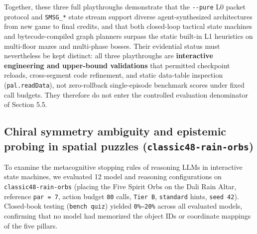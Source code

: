 \documentclass[11pt,a4paper]{article}
\begin{document}
Together, these three full playthroughs demonstrate that the \texttt{-\allowbreak{}-\allowbreak{}pure} L0 packet protocol and \texttt{SMSG\allowbreak{}\_\allowbreak{}*} state stream support diverse agent-synthesized architectures from new game to final credits, and that both closed-loop tactical state machines and bytecode-compiled graph planners surpass the static built-in L1 heuristics on multi-floor mazes and multi-phase bosses. Their evidential status must nevertheless be kept distinct: all three playthroughs are \textbf{interactive engineering and upper-bound validations} that permitted checkpoint reloads, cross-segment code refinement, and static data-table inspection (\texttt{pal\allowbreak{}.\allowbreak{}readData}), not zero-rollback single-episode benchmark scores under fixed call budgets. They therefore do not enter the controlled evaluation denominator of Section 5.5.

\subsection{\texorpdfstring{Chiral symmetry ambiguity and epistemic probing in spatial puzzles (\texttt{classic48\allowbreak{}-\allowbreak{}rain\allowbreak{}-\allowbreak{}orbs})}{Chiral symmetry ambiguity and epistemic probing in spatial puzzles (classic48-rain-orbs)}}

To examine the metacognitive stopping rules of reasoning LLMs in interactive state machines, we evaluated 12 model and reasoning configurations on \texttt{classic48\allowbreak{}-\allowbreak{}rain\allowbreak{}-\allowbreak{}orbs} (placing the Five Spirit Orbs on the Dali Rain Altar, reference \texttt{par\allowbreak{} \allowbreak{}=\allowbreak{} \allowbreak{}7}, action budget \texttt{80} calls, \texttt{Tier\allowbreak{} \allowbreak{}B}, \texttt{standard} hints, \texttt{seed\allowbreak{} \allowbreak{}42}). Closed-book testing (\texttt{bench\allowbreak{} \allowbreak{}quiz}) yielded \texttt{0\%--20\%} across all evaluated models, confirming that no model had memorized the object IDs or coordinate mappings of the five pillars.
\end{document}

